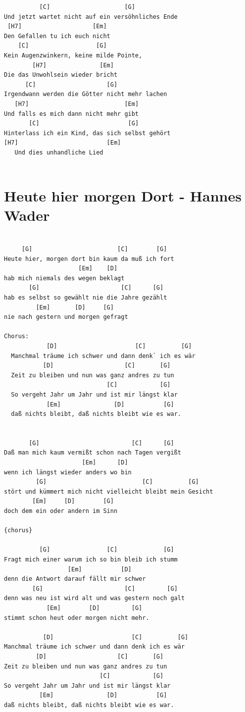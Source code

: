 \documentclass[
]{book}
\let\stdsection\section
\renewcommand\section{\clearpage\stdsection}
\begin{document}
\begin{verbatim}
          [C]                     [G]
Und jetzt wartet nicht auf ein versöhnliches Ende 
 [H7]                    [Em]
Den Gefallen tu ich euch nicht 
    [C]                   [G]
Kein Augenzwinkern, keine milde Pointe,
        [H7]               [Em]
Die das Unwohlsein wieder bricht
      [C]                    [G]
Irgendwann werden die Götter nicht mehr lachen 
   [H7]                           [Em]
Und falls es mich dann nicht mehr gibt 
       [C]                         [G]
Hinterlass ich ein Kind, das sich selbst gehört
[H7]                         [Em]
   Und dies unhandliche Lied
   

\end{verbatim}

\hypertarget{heute-hier-morgen-dort---hannes-wader}{%
\section{Heute hier morgen Dort - Hannes Wader}\label{heute-hier-morgen-dort---hannes-wader}}

\begin{verbatim}

     [G]                        [C]        [G]
Heute hier, morgen dort bin kaum da muß ich fort
                     [Em]    [D]
hab mich niemals des wegen beklagt
       [G]                       [C]      [G]
hab es selbst so gewählt nie die Jahre gezählt
         [Em]       [D]     [G]
nie nach gestern und morgen gefragt

Chorus:
            [D]                      [C]          [G]
  Manchmal träume ich schwer und dann denk` ich es wär
           [D]                    [C]       [G]
  Zeit zu bleiben und nun was ganz andres zu tun
                             [C]            [G]
  So vergeht Jahr um Jahr und ist mir längst klar
            [Em]               [D]           [G]
  daß nichts bleibt, daß nichts bleibt wie es war.
  

       [G]                          [C]      [G]
Daß man mich kaum vermißt schon nach Tagen vergißt
                      [Em]      [D]
wenn ich längst wieder anders wo bin
         [G]                           [C]          [G]
stört und kümmert mich nicht vielleicht bleibt mein Gesicht
        [Em]     [D]        [G]
doch dem ein oder andern im Sinn

{chorus}

          [G]                [C]             [G]
Fragt mich einer warum ich so bin bleib ich stumm
                  [Em]           [D]
denn die Antwort darauf fällt mir schwer
        [G]                       [C]         [G]
denn was neu ist wird alt und was gestern noch galt
            [Em]        [D]         [G]
stimmt schon heut oder morgen nicht mehr.

           [D]                      [C]          [G]
Manchmal träume ich schwer und dann denk ich es wär
         [D]                    [C]       [G]
Zeit zu bleiben und nun was ganz andres zu tun
                           [C]            [G]
So vergeht Jahr um Jahr und ist mir längst klar
          [Em]               [D]           [G]
daß nichts bleibt, daß nichts bleibt wie es war.
\end{verbatim}
\end{document}
